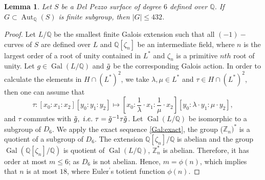 \documentclass[leqno,12pt]{amsart} %
\newtheorem{lem}[thm]{Lemma}
\newcommand{\Z}{\ensuremath{\mathbb{Z}}}
\newcommand{\Q}{\ensuremath{\mathbb{Q} }}
\DeclareMathOperator{\Aut}{Aut}
\DeclareMathOperator{\Gal}{Gal}
\begin{document}
\begin{lem}\label{lemm-19}
   Let $S$ be a Del Pezzo surface of degree $6$ defined over $\Q $.  If $G\subset\Aut_{\Q}(S)$ is finite subgroup, then $\mid G\mid \le 432$.
\end{lem}
\begin{proof} Let $L/\Q $ be the smallest finite Galois extension such that all $(-1)-$curves of $S$ are defined over $L$ and $\Q[\zeta_n]$ be an intermediate field, where $n$ is the largest order of a root of unity contained in $L^*$ and $\zeta_n$ is a primitive $nth$ root of unity. Let $g\in\Gal(L/\Q)$ and $\Tilde{g}$ be the corresponding Galois action. In order to calculate the elements in $H\cap\left(L^{*}\right)^2$, we take $\lambda, \mu \in L^*$ and $\tau\in H\cap\left(L^{*}\right)^2 $, then one can assume that
\begin{equation}\tau:[x_0:x_1:x_2][y_0:y_1:y_2]\mapsto [x_0:\frac{1}{\lambda}\cdot 
 x_1:\frac{1}{\mu}\cdot  x_2][y_0:\lambda\cdot y_1:\mu \cdot y_2],\end{equation}
and $\tau$ commutes with $\Tilde{g},~ i.e. ~\tau=\Tilde{g}^{-1}\tau \Tilde{g}$.
Let $\Gal(L/\Q )$ be isomorphic to a subgroup of $D_6$. We apply the exact sequence \eqref{Gal:exact}, the group ($\Z_n)^*$ is a quotient of a subgroup of $D_6$. The extension $\Q [\zeta_n]/\Q$ is abelian and the group $\Gal(\Q [\zeta_n]/\Q)$ is quotient of $\Gal(L/\Q)$, $\Z_n^*$  is abelian. Therefore, it has order at most $m\le 6$; as $D_6$ is not abelian. Hence, $m=\phi( n )$, which implies that $n$ is at most $18$, where Euler$^{\prime}$s totient function $\phi( n )$.


\end{proof}
\end{document}
